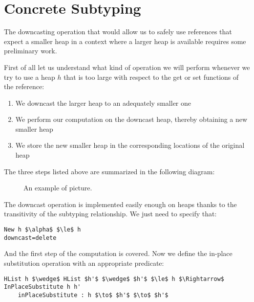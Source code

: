 \documentclass[a4paper]{article}
\begin{document}

\noindent 
\section{Concrete Subtyping}

\noindent The downcasting operation that would allow us to safely use references that expect a smaller heap in a context where a larger heap is available requires some preliminary work. 

\noindent First of all let us understand what kind of operation we will perform whenever we try to use a heap $h$ that is too large with respect to the get or set functions of the reference:

\begin{enumerate}
\item  We downcast the larger heap to an adequately smaller one

\item  We perform our computation on the downcast heap, thereby obtaining a new smaller heap

\item  We store the new smaller heap in the corresponding locations of the original heap
\end{enumerate}

\noindent The three steps listed above are summarized in the following diagram:

\begin{figure}[h]
\centerline{} \caption{An example of picture.\label{fig:example}}
\end{figure}

\noindent The downcast operation is implemented easily enough on heaps thanks to the transitivity of the subtyping relationship. We just need to specify that:


\begin{lstlisting}
New h $\alpha$ $\le$ h
downcast=delete
\end{lstlisting}

And the first step of the computation is covered. Now we define the in-place substitution operation with an appropriate predicate:

\begin{lstlisting}
HList h $\wedge$ HList $h'$ $\wedge$ $h'$ $\le$ h $\Rightarrow$ InPlaceSubstitute h h'
    inPlaceSubstitute : h $\to$ $h'$ $\to$ $h'$
\end{lstlisting}
\end{document}

